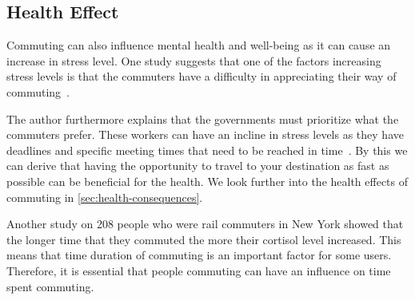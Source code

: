 \subsection{Health Effect}\label{subsec:health-effect}

Commuting can also influence mental health and well-being as it can cause an increase in stress level.
One study suggests that one of the factors increasing stress levels is that the commuters have a difficulty in
appreciating their way of commuting~\cite{koslowsky2013}.

The author furthermore explains that the governments must prioritize what the commuters prefer.
These workers can have an incline in stress levels as they have deadlines and specific meeting times that need to be
reached in time~\cite{koslowsky2013}.
By this we can derive that having the opportunity to travel to your destination as fast as possible can be beneficial
for the health.
We look further into the health effects of commuting in \cref{sec:health-consequences}.

Another study on 208 people who were rail commuters in New York showed that the longer time that they commuted the more
their cortisol level increased.
This means that time duration of commuting is an important factor for some users.
Therefore, it is essential that people commuting can have an influence on time spent commuting.


